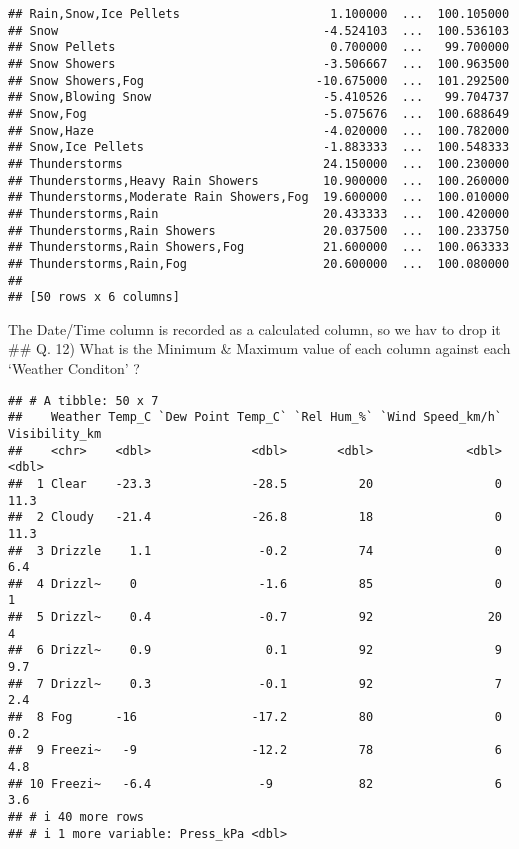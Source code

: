 \documentclass[
]{article}
\begin{document}
\begin{verbatim}
## Rain,Snow,Ice Pellets                     1.100000  ...  100.105000
## Snow                                     -4.524103  ...  100.536103
## Snow Pellets                              0.700000  ...   99.700000
## Snow Showers                             -3.506667  ...  100.963500
## Snow Showers,Fog                        -10.675000  ...  101.292500
## Snow,Blowing Snow                        -5.410526  ...   99.704737
## Snow,Fog                                 -5.075676  ...  100.688649
## Snow,Haze                                -4.020000  ...  100.782000
## Snow,Ice Pellets                         -1.883333  ...  100.548333
## Thunderstorms                            24.150000  ...  100.230000
## Thunderstorms,Heavy Rain Showers         10.900000  ...  100.260000
## Thunderstorms,Moderate Rain Showers,Fog  19.600000  ...  100.010000
## Thunderstorms,Rain                       20.433333  ...  100.420000
## Thunderstorms,Rain Showers               20.037500  ...  100.233750
## Thunderstorms,Rain Showers,Fog           21.600000  ...  100.063333
## Thunderstorms,Rain,Fog                   20.600000  ...  100.080000
## 
## [50 rows x 6 columns]
\end{verbatim}

The Date/Time column is recorded as a calculated column, so we hav to
drop it \#\# Q. 12) What is the Minimum \& Maximum value of each column
against each `Weather Conditon' ?

\begin{verbatim}
## # A tibble: 50 x 7
##    Weather Temp_C `Dew Point Temp_C` `Rel Hum_%` `Wind Speed_km/h` Visibility_km
##    <chr>    <dbl>              <dbl>       <dbl>             <dbl>         <dbl>
##  1 Clear    -23.3              -28.5          20                 0          11.3
##  2 Cloudy   -21.4              -26.8          18                 0          11.3
##  3 Drizzle    1.1               -0.2          74                 0           6.4
##  4 Drizzl~    0                 -1.6          85                 0           1  
##  5 Drizzl~    0.4               -0.7          92                20           4  
##  6 Drizzl~    0.9                0.1          92                 9           9.7
##  7 Drizzl~    0.3               -0.1          92                 7           2.4
##  8 Fog      -16                -17.2          80                 0           0.2
##  9 Freezi~   -9                -12.2          78                 6           4.8
## 10 Freezi~   -6.4               -9            82                 6           3.6
## # i 40 more rows
## # i 1 more variable: Press_kPa <dbl>
\end{verbatim}
\end{document}
